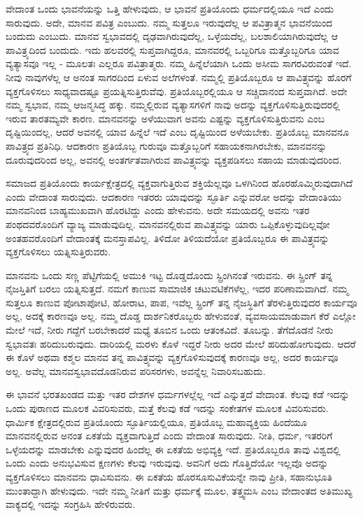 ವೇದಾಂತ ಒಂದು ಭಾವನೆಯನ್ನು ಒತ್ತಿ ಹೇಳುವುದು, ಆ ಭಾವನೆ ಪ್ರತಿಯೊಂದು ಧರ್ಮದಲ್ಲಿಯೂ ಇದೆ ಎಂದು ಸಾರುವುದು. ಅದೇ, ಮಾನವ ಪವಿತ್ರ ಎಂಬುದು. ನಮ್ಮ ಸುತ್ತಲೂ ಇರುವುದೆಲ್ಲ ಆ ಪವಿತ್ರಾತ್ಮನ ಭಾವನೆಯಿಂದ ಬಂದುದು ಎಂಬುದು. ಮಾನವ ಸ್ವಭಾವದಲ್ಲಿ ದೃಢವಾಗಿರುವುದೆಲ್ಲ, ಒಳ್ಳೆಯದೆಲ್ಲ, ಬಲಶಾಲಿಯಾಗಿರುವುದೆಲ್ಲ ಆ ಪಾವಿತ್ರ್ಯದಿಂದ ಬಂದುದು. ಇದು ಹಲವರಲ್ಲಿ ಸುಪ್ತವಾಗಿದ್ದರೂ, ಮಾನವರಲ್ಲಿ ಒಬ್ಬರಿಗೂ ಮತ್ತೊಬ್ಬರಿಗೂ ಯಾವ ವ್ಯತ್ಯಾಸವೂ ಇಲ್ಲ - ಮೂಲತಃ ಎಲ್ಲರೂ ಪವಿತ್ರಾತ್ಮರು. ನಮ್ಮ ಹಿನ್ನೆಲೆಯಾಗಿ ಒಂದು ಅಸೀಮ ಸಾಗರವಿರುವಂತೆ ಇದೆ. ನೀವು ನಾವುಗಳೆಲ್ಲ ಆ ಅನಂತ ಸಾಗರದಿಂದ ಏಳುವ ಅಲೆಗಳಂತೆ. ನಮ್ಮಲ್ಲಿ ಪ್ರತಿಯೊಬ್ಬರೂ ಆ ಪಾವಿತ್ರ್ಯವನ್ನು ಹೊರಗೆ ವ್ಯಕ್ತಗೊಳಿಸಲು ಸಾಧ್ಯವಾದಷ್ಟೂ ಪ್ರಯತ್ನಿಸುತ್ತಿರುವೆವು. ಪ್ರತಿಯೊಬ್ಬರಲ್ಲಿಯೂ ಆ ಸಚ್ಚಿದಾನಂದ ಸುಪ್ತವಾಗಿದೆ. ಅದೇ ನಮ್ಮ ಸ್ವಭಾವ, ನಮ್ಮ ಆಜನ್ಮಸಿದ್ಧ ಹಕ್ಕು. ನಮ್ಮಲ್ಲಿರುವ ವ್ಯತ್ಯಾಸಗಳಿಗೆ ನಾವು ಅದನ್ನು ವ್ಯಕ್ತಗೊಳಿಸುತ್ತಿರುವುದರಲ್ಲಿ ಇರುವ ತಾರತಮ್ಯವೇ ಕಾರಣ. ಮಾನವನನ್ನು ಅಳೆಯುವಾಗ ಅವನು ಎಷ್ಟನ್ನು ವ್ಯಕ್ತಗೊಳಿಸುತ್ತಿರುವನು ಎಂಬ ದೃಷ್ಟಿಯಿಂದಲ್ಲ, ಆದರೆ ಅವನಲ್ಲಿ ಯಾವ ಹಿನ್ನೆಲೆ ಇದೆ ಎಂಬ ದೃಷ್ಟಿಯಿಂದ ಅಳೆಯಬೇಕು. ಪ್ರತಿಯೊಬ್ಬ ಮಾನವನೂ ಪಾವಿತ್ರ್ಯದ ಪ್ರತಿನಿಧಿ. ಆದಕಾರಣ ಪ್ರತಿಯೊಬ್ಬ ಗುರುವೂ ಮತ್ತೊಬ್ಬರಿಗೆ ಸಹಾಯಕನಾಗಿರಬೇಕು, ಮಾನವನನ್ನು ದೂರುವುದರಿಂದ ಅಲ್ಲ, ಅವನಲ್ಲಿ ಅಂತರ್ಗತವಾಗಿರುವ ಪಾವಿತ್ರ್ಯವನ್ನು ವ್ಯಕ್ತಪಡಿಸಲು ಸಹಾಯ ಮಾಡುವುದರಿಂದ.

ಸಮಾಜದ ಪ್ರತಿಯೊಂದು ಕಾರ್ಯಕ್ಷೇತ್ರದಲ್ಲಿ ವ್ಯಕ್ತವಾಗುತ್ತಿರುವ ಶಕ್ತಿಯೆಲ್ಲವೂ ಒಳಗಿನಿಂದ ಹೊರಹೊಮ್ಮಿರುವುದಾಗಿದೆ ಎಂದು ವೇದಾಂತ ಸಾರುವುದು. ಆದಕಾರಣ ಇತರರು ಯಾವುದನ್ನು ಸ್ಫೂರ್ತಿ ಎನ್ನುವರೋ ಅದನ್ನು ವೇದಾಂತಿಯು ಮಾನವನಿಂದ ಬಾಹ್ಯಮುಖವಾಗಿ ಹೊರಟಿದ್ದು ಎಂದು ಹೇಳುವನು. ಅದೇ ಸಮಯದಲ್ಲಿ ಅವನು ಇತರ ಪಂಥದವರೊಂದಿಗೆ ವ್ಯಾಜ್ಯ ಮಾಡುವುದಿಲ್ಲ. ಮಾನವನಲ್ಲಿರುವ ಪಾವಿತ್ರ್ಯವನ್ನು ಯಾರು ಒಪ್ಪಿಕೊಳ್ಳುವುದಿಲ್ಲವೋ ಅಂತಹವರೊಂದಿಗೆ ವೇದಾಂತಕ್ಕೆ ಮನಸ್ತಾಪವಿಲ್ಲ. ತಿಳಿದೋ ತಿಳಿಯದೆಯೋ ಪ್ರತಿಯೊಬ್ಬರೂ ಈ ಪಾವಿತ್ರ್ಯವನ್ನು ವ್ಯಕ್ತಗೊಳಿಸಲು ಯತ್ನಿಸುತ್ತಿರುವರು.

ಮಾನವನು ಒಂದು ಸಣ್ಣ ಪೆಟ್ಟಿಗೆಯಲ್ಲಿ ಅಮುಕಿ ಇಟ್ಟ ದೊಡ್ಡದೊಂದು ಸ್ಪ್ರಿಂಗಿನಂತೆ ಇರುವನು. ಈ ಸ್ಪ್ರಿಂಗ್ ತನ್ನ ನೈಜಸ್ತಿತಿಗೆ ಬರಲು ಯತ್ನಿಸುತ್ತದೆ. ನಮಗೆ ಕಾಣುವ ಸಾಮಾಜಿಕ ಚಟುವಟಿಕೆಗಳೆಲ್ಲ, ಇದರ ಪರಿಣಾಮವಾಗಿದೆ. ನಮ್ಮ ಸುತ್ತಲೂ ಕಾಣುವ ಪೋಟಾಪೋಟಿ, ಹೋರಾಟ, ಪಾಪ, ಇವೆಲ್ಲ ಸ್ಪ್ರಿಂಗ್ ತನ್ನ ನೈಜಸ್ಥಿತಿಗೆ ತೆರಳುತ್ತಿರುವುದರ ಕಾರ್ಯವೂ ಅಲ್ಲ, ಅದಕ್ಕೆ ಕಾರಣವೂ ಅಲ್ಲ. ನಮ್ಮ ದೊಡ್ಡ ದಾರ್ಶನಿಕರೊಬ್ಬರು ಹೇಳುವಂತೆ, ವ್ಯವಸಾಯಮಾಡುವಾಗ ಕೆರೆ ಎಲ್ಲೋ ಮೇಲೆ ಇದೆ, ನೀರು ಗದ್ದೆಗೆ ಬರಬೇಕಾದರೆ ಮಧ್ಯೆ ತೂಬಿನ ಒಂದು ಆತಂಕವಿದೆ. ತೂಬನ್ನು. ತೆಗೆದೊಡನೆ ನೀರು ಸ್ವಭಾವತಃ ಹರಿದುಬರುವುದು. ದಾರಿಯಲ್ಲಿ ಮರಳು ಕೊಳೆ ಇದ್ದರೆ ನೀರು ಅದರ ಮೇಲೆ ಹರಿದುಹೋಗುವುದು. ಆದರೆ ಈ ಕೊಳೆ ಅಥವಾ ಕಶ್ಮಲ ಮಾನವ ತನ್ನ ಪಾವಿತ್ರ್ಯವನ್ನು ವ್ಯಕ್ತಗೊಳಿಸುವುದಕ್ಕೆ ಕಾರಣವೂ ಅಲ್ಲ, ಅದರ ಕಾರ್ಯವೂ ಅಲ್ಲ. ಅವೆಲ್ಲ ಮಾನವಸ್ವಭಾವದೊಡನಿರುವ ಪರಿಸರಗಳು, ಅವನ್ನೆಲ್ಲ ನಿವಾರಿಸಬಹುದು.

ಈ ಭಾವನೆ ಭರತಖಂಡದ ಮತ್ತು ಇತರ ದೇಶಗಳ ಧರ್ಮಗಳಲ್ಲೆಲ್ಲ ಇದೆ ಎನ್ನುತ್ತದೆ ವೇದಾಂತ. ಕೆಲವು ಕಡೆ ಇದನ್ನು ಒಂದು ಪುರಾಣದ ಮೂಲಕ ವಿವರಿಸುವರು, ಮತ್ತೆ ಕೆಲವು ಕಡೆ ಇದನ್ನು ಸಂಕೇತಗಳ ಮೂಲಕ ವಿವರಿಸುವರು. ಧಾರ್ಮಿಕ ಕ್ಷೇತ್ರದಲ್ಲಿರುವ ಪ್ರತಿಯೊಂದು ಸ್ಫೂರ್ತಿಯಲ್ಲಿಯೂ, ಪ್ರತಿಯೊಬ್ಬ ಮಹಾವ್ಯಕ್ತಿಯ ಹಿಂದೆಯೂ ಮಾನವನಲ್ಲಿರುವ ಅನಂತ ಏಕತೆಯೆ ವ್ಯಕ್ತವಾಗುತ್ತಿದೆ ಎಂದು ವೇದಾಂತ ಸಾರುವುದು. ನೀತಿ, ಧರ್ಮ, ಇತರರಿಗೆ ಒಳ್ಳೆಯದನ್ನು ಮಾಡಬೇಕು ಎನ್ನುವುದರ ಹಿಂದೆಲ್ಲ ಈ ಏಕತೆಯ ಅಭಿವ್ಯಕ್ತಿ ಇದೆ. ಪ್ರತಿಯೊಬ್ಬರೂ ತಾವು ವಿಶ್ವದಲ್ಲಿ ಒಂದು ಎಂದು ಅನುಭವಿಸುವ ಕ್ಷಣಗಳು ಕೆಲವು ಇರುವುವು. ಅವನಿಗೆ ಅದು ಗೊತ್ತಿದೆಯೋ ಇಲ್ಲವೊ ಅದನ್ನು ವ್ಯಕ್ತಗೊಳಿಸಲು ಮಾನವನು ಧಾವಿಸುವನು. ಈ ಏಕತೆಯ ಹೊರಸೂಸುವಿಕೆಯನ್ನೇ ನಾವು ಪ್ರೀತಿ, ಸಹಾನುಭೂತಿ ಮುಂತಾದ್ದಾಗಿ ಹೇಳುವುದು. ಇದೇ ನಮ್ಮ ನೀತಿಗೆ ಮತ್ತು ಧರ್ಮಕ್ಕೆ ಮೂಲ, ತತ್ತ್ವಮಸಿ ಎಂಬ ವೇದಾಂತದ ಅತಿಮುಖ್ಯ ವಾಕ್ಯದಲ್ಲಿ ಇದನ್ನು ಸಂಗ್ರಹಿಸಿ ಹೇಳಿರುವರು.

